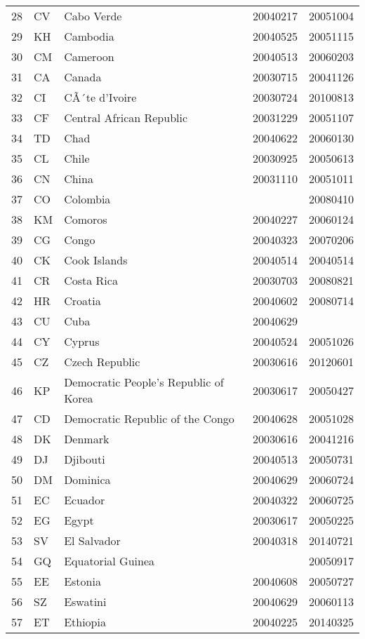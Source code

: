 \begin{longtable}{rllrr}
  28 & CV & Cabo Verde & 20040217 & 20051004 \\ 
  29 & KH & Cambodia & 20040525 & 20051115 \\ 
  30 & CM & Cameroon & 20040513 & 20060203 \\ 
  31 & CA & Canada & 20030715 & 20041126 \\ 
  32 & CI & CÃ´te d'Ivoire & 20030724 & 20100813 \\ 
  33 & CF & Central African Republic & 20031229 & 20051107 \\ 
  34 & TD & Chad & 20040622 & 20060130 \\ 
  35 & CL & Chile & 20030925 & 20050613 \\ 
  36 & CN & China & 20031110 & 20051011 \\ 
  37 & CO & Colombia &  & 20080410 \\ 
  38 & KM & Comoros & 20040227 & 20060124 \\ 
  39 & CG & Congo & 20040323 & 20070206 \\ 
  40 & CK & Cook Islands & 20040514 & 20040514 \\ 
  41 & CR & Costa Rica & 20030703 & 20080821 \\ 
  42 & HR & Croatia & 20040602 & 20080714 \\ 
  43 & CU & Cuba & 20040629 &  \\ 
  44 & CY & Cyprus & 20040524 & 20051026 \\ 
  45 & CZ & Czech Republic & 20030616 & 20120601 \\ 
  46 & KP & Democratic People's Republic of Korea & 20030617 & 20050427 \\ 
  47 & CD & Democratic Republic of the Congo & 20040628 & 20051028 \\ 
  48 & DK & Denmark & 20030616 & 20041216 \\ 
  49 & DJ & Djibouti & 20040513 & 20050731 \\ 
  50 & DM & Dominica & 20040629 & 20060724 \\ 
  51 & EC & Ecuador & 20040322 & 20060725 \\ 
  52 & EG & Egypt & 20030617 & 20050225 \\ 
  53 & SV & El Salvador & 20040318 & 20140721 \\ 
  54 & GQ & Equatorial Guinea &  & 20050917 \\ 
  55 & EE & Estonia & 20040608 & 20050727 \\ 
  56 & SZ & Eswatini & 20040629 & 20060113 \\ 
  57 & ET & Ethiopia & 20040225 & 20140325 \\ 

\end{longtable}
